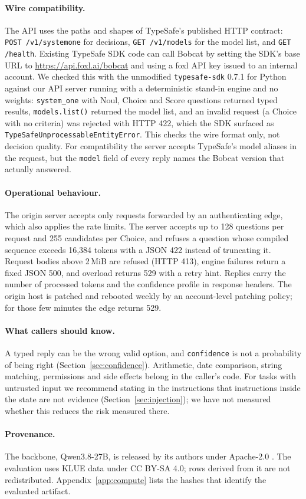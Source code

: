 \paragraph{Wire compatibility.}
The API uses the paths and shapes of TypeSafe's published HTTP contract: \texttt{POST
/v1/systemone} for decisions, \texttt{GET /v1/models} for the model list, and \texttt{GET
/health}. Existing TypeSafe SDK code can call Bobcat by setting the SDK's base URL to
\url{https://api.foxl.ai/bobcat} and using a foxl API key issued to an internal account.
We checked this with the unmodified \texttt{typesafe-sdk} 0.7.1 for Python against our API
server running with a deterministic stand-in engine and no weights: \texttt{system\_one}
with Noul, Choice and Score questions returned typed results, \texttt{models.list()}
returned the model list, and an invalid request (a Choice with no criteria) was rejected with
HTTP 422, which the SDK surfaced as \texttt{TypeSafeUnprocessableEntityError}. This checks the
wire format only, not decision quality. For compatibility the server accepts TypeSafe's model
aliases in the request, but the \texttt{model} field of every reply names the Bobcat version
that actually answered.

\paragraph{Operational behaviour.}
The origin server accepts only requests forwarded by an authenticating edge, which also
applies the rate limits. The server accepts up to 128
questions per request and 255 candidates per Choice, and refuses a question whose compiled
sequence exceeds 16,384 tokens with a JSON 422 instead of truncating it. Request bodies above
2\,MiB are refused (HTTP 413), engine failures return a fixed JSON 500, and overload returns
529 with a retry hint. Replies carry the number of processed tokens and the confidence profile
in response headers. The origin host is patched and rebooted weekly by an account-level
patching policy; for those few minutes the edge returns 529.

\paragraph{What callers should know.}
A typed reply can be the wrong valid option, and \texttt{confidence} is not a probability of
being right (Section~\ref{sec:confidence}). Arithmetic, date comparison, string matching,
permissions and side effects belong in the caller's code. For tasks with untrusted input we
recommend stating in the instructions that instructions inside the state are not evidence
(Section~\ref{sec:injection}); we have not measured whether this reduces the risk measured
there.

\paragraph{Provenance.}
The backbone, Qwen3.8-27B, is released by its authors under Apache-2.0 \citep{qwen38_27b}. The
evaluation uses KLUE data \citep{park2021klue} under CC BY-SA 4.0; rows derived from it are not
redistributed. Appendix~\ref{app:compute} lists the hashes that identify the evaluated
artifact.
